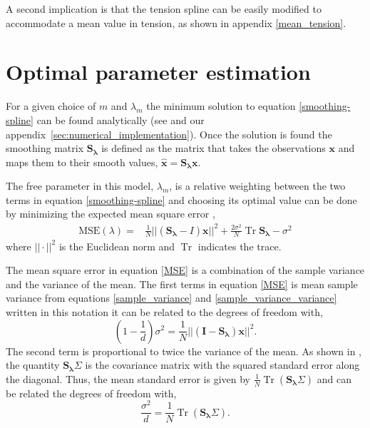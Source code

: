 \documentclass[10pt,journal]{IEEEtran}
\DeclareMathOperator{\Tr}{Tr}
\begin{document}
A second implication is that the tension spline can be easily modified to accommodate a mean value in tension, as shown in appendix \ref{mean_tension}. 

%
\section{Optimal parameter estimation} \label{sec:optimal_parameter}
%

For a given choice of $m$ and $\lambda_m$ the minimum solution to equation \ref{smoothing-spline} can be found analytically (see \cite{teanby2007-mg} and our appendix~\ref{sec:numerical_implementation}). Once the solution is found the smoothing matrix $\mathbf{S_\lambda}$ is defined as the matrix that takes the observations $\mathbf{x}$ and maps them to their smooth values, $\mathbf{\hat{x}} = \mathbf{S_\lambda} \mathbf{x}$.

The free parameter in this model, $\lambda_m$, is a relative weighting between the two terms in equation \ref{smoothing-spline} and choosing its optimal value can be done by minimizing the expected mean square error \cite{craven1979-nm},
\begin{align}
\label{MSE}
    \textrm{MSE}(\lambda) =& \frac{1}{N} || \left( \mathbf{S_\lambda} - I \right) \mathbf{x} ||^2 + \frac{2 \sigma^2}{N}  \Tr \mathbf{S_\lambda} - \sigma^2
\end{align}
where $||\cdot||^2$ is the Euclidean norm and $\Tr$ indicates the trace.

The mean square error in equation \ref{MSE} is a combination of the sample variance and the variance of the mean. The first terms in equation \ref{MSE} is mean sample variance from equations \ref{sample_variance} and \ref{sample_variance_variance} written in this notation it can be related to the degrees of freedom with,
\begin{equation}
    \left(1-\frac{1}{d} \right)\sigma^2 = \frac{1}{N} || \left( \mathbf{I} - \mathbf{S_\lambda} \right) \mathbf{x} ||^2.
\end{equation}
The second term is proportional to twice the variance of the mean. As shown in \cite{teanby2007-mg}, the quantity $\mathbf{S_\lambda} \Sigma$ is the covariance matrix with the squared standard error along the diagonal. Thus, the mean standard error is given by $\frac{1}{N} \Tr \left( \mathbf{S_\lambda} \Sigma \right)$ and can be related the degrees of freedom with,
\begin{equation}
    \frac{\sigma^2}{d} = \frac{1}{N} \Tr \left( \mathbf{S_\lambda} \Sigma \right).
\end{equation}
\end{document}
